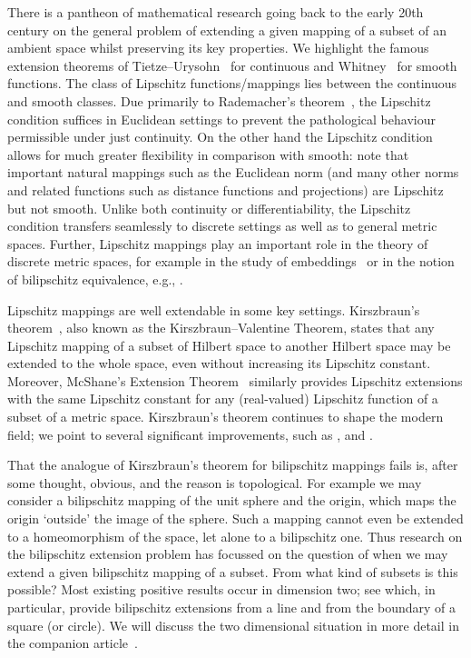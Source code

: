 \documentclass[a4paper, bibliography=totoc]{scrartcl}
\numberwithin{claimcounter}{define}
\begin{document}
There is a pantheon of mathematical research going back to the early 20th century on the general problem of extending a given mapping of a subset of an ambient space whilst preserving its key properties. We highlight the famous extension theorems of Tietze--Urysohn~\cite{Tietze--Urysohn} for continuous and Whitney~\cite{whitney} for smooth functions. The class of Lipschitz functions/mappings lies between the continuous and smooth classes. Due primarily to Rademacher's theorem~\cite{rademacher1919partielle}, the Lipschitz condition suffices in Euclidean settings to prevent the pathological behaviour permissible under just continuity. On the other hand the Lipschitz condition allows for much greater flexibility in comparison with smooth: note that important natural mappings such as the Euclidean norm (and many other norms and related functions such as distance functions and projections) are Lipschitz but not smooth. Unlike both continuity or differentiability, the Lipschitz condition transfers seamlessly to discrete settings as well as to general metric spaces. Further, Lipschitz mappings play an important role in the theory of discrete metric spaces, for example in the study of embeddings~\cite{Matousek_MetricEmb, Ostrovskii_MetricEmb} or in the notion of bilipschitz equivalence, e.g., \cite{BK1, McM}.

Lipschitz mappings are well extendable in some key settings. Kirszbraun's theorem~\cite{Kirszbraun,Valentine}, also known as the Kirszbraun--Valentine Theorem, states that any Lipschitz mapping of a subset of Hilbert space to another Hilbert space may be extended to the whole space, even without increasing its Lipschitz constant. Moreover, McShane's Extension Theorem~\cite{mcshane_extension} similarly provides Lipschitz extensions with the same Lipschitz constant for any (real-valued) Lipschitz function of a subset of a metric space. Kirszbraun's theorem continues to shape the modern field; we point to several significant improvements, such as \cite{EvaKopecka2012}, \cite{Azagra2021} and \cite{Ciosmak2024}.

That the analogue of Kirszbraun's theorem for bilipschitz mappings fails is, after some thought, obvious, and the reason is topological. For example we may consider a bilipschitz mapping of the unit sphere and the origin, which maps the origin `outside' the image of the sphere. Such a mapping cannot even be extended to a homeomorphism of the space, let alone to a bilipschitz one. Thus research on the bilipschitz extension problem has focussed on the question of when we may extend a given bilipschitz mapping of a subset. From what kind of subsets is this possible? Most existing positive results occur in dimension two; see \cite{Tukia_planar_Schoenflies, tukia1981extension, DP_bilip_square, Kovalev_bilip_ext_from_line, Kovalev_optimal_bilip} which, in particular, provide bilipschitz extensions from a line and from the boundary of a square (or circle). We will discuss the two dimensional situation in more detail in the companion article~\cite{DK_2dim}.
\end{document}
